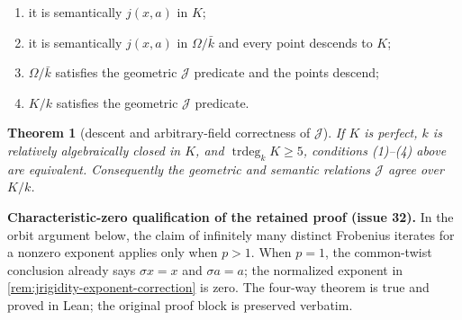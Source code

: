 \documentclass[11pt,oneside]{article}
\newtheorem{theorem}{Theorem}[section]
\theoremstyle{definition}
\theoremstyle{remark}
\newcommand{\trdeg}{\operatorname{trdeg}}
\newcommand{\Jrel}{\mathcal{J}}
\begin{document}
\begin{enumerate}[label=(\arabic*),leftmargin=10mm]
\item it is semantically $j(x,a)$ in $K$;
\item it is semantically $j(x,a)$ in $\Omega/\bar k$ and every point descends to $K$;
\item $\Omega/\bar k$ satisfies the geometric $\Jrel$ predicate and the points descend;
\item $K/k$ satisfies the geometric $\Jrel$ predicate.
\end{enumerate}

\begin{theorem}[descent and arbitrary-field correctness of $\Jrel$]\label{thm:j-descent}
If $K$ is perfect, $k$ is relatively algebraically closed in $K$, and
$\trdeg_kK\geq5$, conditions (1)--(4) above are equivalent.  Consequently the geometric
and semantic relations $\Jrel$ agree over $K/k$.
\end{theorem}
\noindent\textbf{Characteristic-zero qualification of the retained proof (issue 32).}
In the orbit argument below, the claim of infinitely many distinct Frobenius iterates
for a nonzero exponent applies only when $p>1$. When $p=1$, the common-twist conclusion
already says $\sigma x=x$ and $\sigma a=a$; the normalized exponent in
\cref{rem:jrigidity-exponent-correction} is zero. The four-way theorem is true and proved
in Lean; the original proof block is preserved verbatim.
\end{document}
